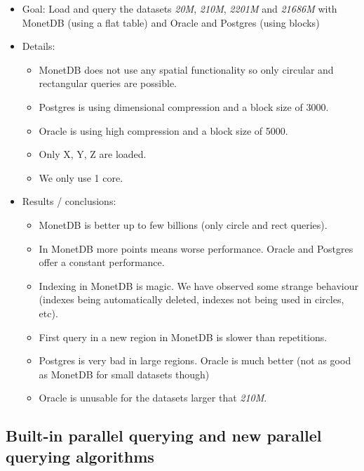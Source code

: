 \documentclass[a4paper,11pt]{article}
\begin{document}
\begin{itemize}
	\item Goal: Load and query the datasets \textit{20M}, \textit{210M}, \textit{2201M} and \textit{21686M} with MonetDB (using a flat table) and Oracle and Postgres (using blocks)
	\item Details: 
	\begin{itemize}
		\item MonetDB does not use any spatial functionality so only circular and rectangular queries are possible.
		\item Postgres is using dimensional compression and a block size of 3000.
		\item Oracle is using high compression and a block size of 5000.
		\item Only X, Y, Z are loaded.
		\item We only use 1 core.
	\end{itemize}				
	\item Results / conclusions: 
	\begin{itemize}
		\item MonetDB is better up to few billions (only circle and rect queries).
		\item In MonetDB more points means worse performance. Oracle and Postgres offer a constant performance.
		\item Indexing in MonetDB is magic. We have observed some strange behaviour (indexes being automatically deleted, indexes not being used in circles, etc).
		\item First query in a new region in MonetDB is slower than repetitions.
		\item Postgres is very bad in large regions. Oracle is much better (not as good as MonetDB for small datasets though)
		\item Oracle is unusable for the datasets larger that \textit{210M}. 
	\end{itemize}			
\end{itemize}
\subsection{Built-in parallel querying and new parallel querying algorithms}
\end{document}
